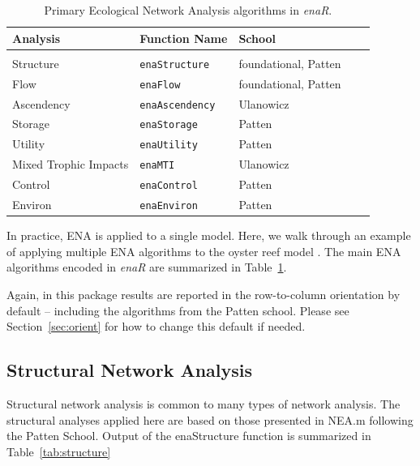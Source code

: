 \documentclass[article]{jss}
\begin{document}
\begin{table}
\center
\caption{Primary Ecological Network Analysis algorithms in
  \textit{enaR}.} \label{tab:alg}
\tableline
\begin{tabular}{l l l l l }
\textbf{Analysis} & \textbf{Function Name} & \textbf{School} \\ \hline \\ [-1ex]
Structure & \texttt{enaStructure} & foundational, Patten \\
Flow & \texttt{enaFlow} & foundational, Patten \\
Ascendency & \texttt{enaAscendency} & Ulanowicz \\
Storage & \texttt{enaStorage} & Patten \\
Utility & \texttt{enaUtility} & Patten \\
Mixed Trophic Impacts & \texttt{enaMTI} & Ulanowicz \\
Control & \texttt{enaControl} & Patten \\
Environ & \texttt{enaEnviron} & Patten \\
\end{tabular}
\tableline
\end{table}


In practice, ENA is applied to a single model.  Here, we walk through an
example of applying multiple ENA algorithms to the oyster reef model
\citep{dame81}.  The main ENA algorithms encoded in \textit{enaR} are
summarized in Table~\ref{tab:alg}.

Again, in this package results are reported in the row-to-column
orientation by default -- including the algorithms from the Patten
school.  Please see Section~\ref{sec:orient} for how to change this
default if needed.

\subsection{Structural Network Analysis}
Structural network analysis is common to many types of network
analysis.  The structural analyses applied here are based on those
presented in NEA.m \citep{fath06} following the Patten School.  Output
of the enaStructure function is summarized in Table~\ref{tab:structure}
\end{document}
